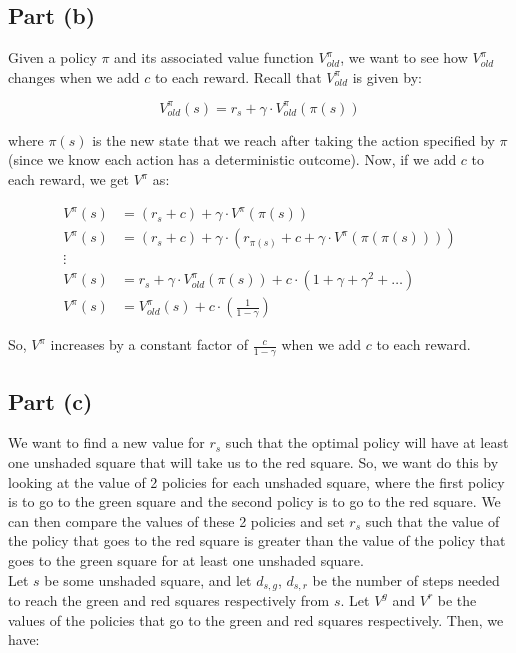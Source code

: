 \documentclass[a4paper]{article}
\begin{document}
\subsection*{Part (b)}
Given a policy $\pi$ and its associated value function $V^{\pi}_{old}$, we want to see how $V^{\pi}_{old}$ changes when we add $c$ to each reward. Recall that $V^{\pi}_{old}$ is given by:

\[
V^{\pi}_{old}(s) = r_s + \gamma \cdot V^{\pi}_{old}(\pi(s))
\]

\noindent where $\pi(s)$ is the new state that we reach after taking the action specified by $\pi$ (since we know each action has a deterministic outcome). Now, if we add $c$ to each reward, we get $V^{\pi}$ as:

\begin{align*}
V^{\pi}(s) &= (r_s + c) + \gamma \cdot V^{\pi}(\pi(s)) \\
V^{\pi}(s) &= (r_s + c) + \gamma \cdot \left(r_{\pi(s)} + c + \gamma \cdot V^{\pi}(\pi(\pi(s))) \right) \\
\vdots \\
V^{\pi}(s) &= r_s + \gamma \cdot V^{\pi}_{old}(\pi(s)) + c \cdot \left(1 + \gamma + \gamma^2 + \ldots \right) \\
V^{\pi}(s) &= V^{\pi}_{old}(s) + c \cdot \left(\frac{1}{1 - \gamma} \right)
\end{align*}

\noindent So, $V^{\pi}$ increases by a constant factor of $\frac{c}{1 - \gamma}$ when we add $c$ to each reward.


\subsection*{Part (c)}
We want to find a new value for $r_s$ such that the optimal policy will have at least one unshaded square that will take us to the red square. So, we want do this by looking at the value of 2 policies for each unshaded square, where the first policy is to go to the green square and the second policy is to go to the red square. We can then compare the values of these 2 policies and set $r_s$ such that the value of the policy that goes to the red square is greater than the value of the policy that goes to the green square for at least one unshaded square.\\

\noindent Let $s$ be some unshaded square, and let $d_{s,g}$, $d_{s,r}$ be the number of steps needed to reach the green and red squares respectively from $s$. Let $V^{g}$ and $V^{r}$ be the values of the policies that go to the green and red squares respectively. Then, we have:
\end{document}
